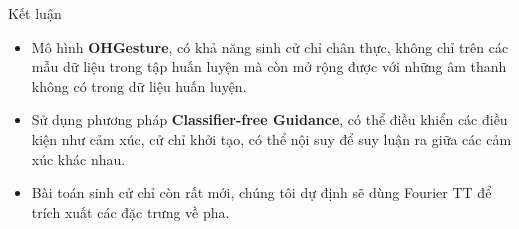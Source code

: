 \begin{frame}[label=frame]{{Kết luận}}
	\begin{itemize}
		\item Mô hình \textbf{OHGesture}, có khả năng sinh cử chỉ chân thực, không chỉ trên các mẫu dữ liệu trong tập huấn luyện mà còn mở rộng được với những âm thanh không có trong dữ liệu huấn luyện.
		
		\item Sử dụng phương pháp \textbf{Classifier-free Guidance}, có thể điều khiển các điều kiện như cảm xúc, cử chỉ khởi tạo, có thể nội suy để suy luận ra giữa các cảm xúc khác nhau.
		
		\item Bài toán sinh cử chỉ còn rất mới, chúng tôi dự định sẽ dùng Fourier TT để trích xuất các đặc trưng về pha.
		
	\end{itemize}
	

%	
%	
%	
\end{frame}